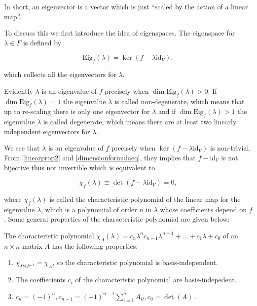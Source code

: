 \documentclass[a4paper,12pt]{report}
\begin{document}
In short, an eigenvector is a vector which is just ``scaled by the action of a linear map''.

To discuss this we first introduce the idea of eigenspaces. The eigenspace for \(\lambda \in F\) is defined by

\begin{equation}
    \text{Eig}_{f}(\lambda ) = \ker (f - \lambda \mathrm{id}_{V} ),  
\end{equation}

which collects all the eigenvectors for \(\lambda \).  

Evidently \(\lambda \) is an eigenvalue of \(f\) precisely when \(\dim \text{Eig}_{f}(\lambda ) > 0\). If \(\dim \text{Eig}_{f}(\lambda ) = 1 \) the eigenvalue \(\lambda\) is called non-degenerate, which means that up to re-scaling there is only one eigenvector for \(\lambda \) and if \(\dim \text{Eig}_{f}(\lambda ) > 1  \) the eigenvalue \(\lambda \) is called degenerate, which means there are at least two linearly independent eigenvectors for \(\lambda \).        

We see that \(\lambda \) is an eigenvalue of \(f\) precisely when \(\ker (f - \lambda \mathrm{id}_{V} )\) is non-trivial. From \cref{linearprop2} and \cref{dimensionformulaeq}, they implies that \(f - \mathrm{id}_{V} \) is not bijective thus not invertible which is equivalent to 

\begin{equation}
    \chi _{f}(\lambda ) \equiv \det (f - \lambda \mathrm{id}_{V} ) = 0,
\end{equation}

where \(\chi _{f}(\lambda ) \) is called the characteristic polynomial of the linear map for the eigenvalue \(\lambda \), which is a polynomial of order \(n\) in \(\lambda \) whose coefficients depend on \(f\). Some general properties of the characteristic polynomial are given below:

\begin{lemma}
The characteristic polynomial \(\chi _{A}(\lambda ) = c_{n}\lambda ^{n} c_{n-1}\lambda ^{n-1} + \ldots + c_1 \lambda +c_0 \) of an \(n \times n\) matrix \(A\) has the following properties:

\begin{enumerate}[label=(O\arabic*)]
    \item \(\chi _{PAP^{-1} } = \chi _{A}  \), so the characteristic polynomial is basis-independent. \label{charpolyinde} 
    \item The coeffiecients \(c_{i} \) of the characteristic polynomial are basis-indepedent.
    \item \(c_{n} = (-1)^{n}, c_{n-1} = (-1)^{n-1}\sum_{i=1}^{n} A_{ii}, c_0 = \det (A).\).    
\end{enumerate}

\end{lemma}
\end{document}
